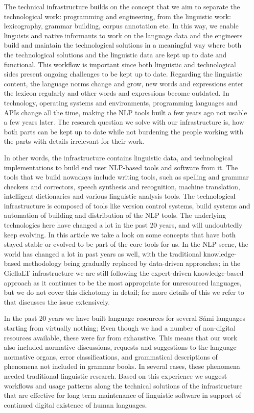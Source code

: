 \documentclass[free]{flammie}
\begin{document}
The technical infrastructure builds on the concept that we aim to separate the
technological work: programming and engineering, from the linguistic work:
lexicography, grammar building, corpus annotation etc.  In this way, we enable
linguists and native informants to work on the language data and the engineers
build and maintain the technological solutions in a meaningful way where both
the technological solutions and the linguistic data are kept up to date and
functional.  This workflow is important since both linguistic and technological
sides present ongoing challenges to be kept up to date.  Regarding the
linguistic content, the language norms change and grow, new words and
expressions enter the lexicon regularly and other words and expressions become
outdated.  In technology, operating systems and environments, programming
languages and APIs change all the time, making the NLP tools built a few years
ago not usable a few years later.  The research question we solve with our
infrastructure is, how both parts can be kept up to date while not burdening the
people working with the parts with details irrelevant for their work.


In other words, the infrastructure contains linguistic data, and technological
implementations to build end user NLP-based tools and software from it.  The
tools that we build nowadays include writing tools, such as spelling and grammar
checkers and correctors, speech synthesis and recognition, machine translation,
intelligent dictionaries and various linguistic analysis tools.  The
technological infrastructure is composed of tools like version control systems,
build systems and automation of building and distribution of the NLP tools.  The
underlying technologies here have changed a lot in the past 20 years, and will
undoubtedly keep evolving. In this article we take a look on some concepts that
have both stayed stable or evolved to be part of the core tools for us.  In the
NLP scene, the world has changed a lot in past years as well, with the
traditional knowledge-based methodology being gradually replaced by data-driven
approaches; in the GiellaLT infrastructure we are still following the
expert-driven knowledge-based approach as it continues to be the most
appropriate for unresourced languages, but we do not cover this dichotomy in
detail; for more details of this we refer to~\cite{wiechetek2022unmasking} that
discusses the issue extensively.

In the past 20 years we have built language resources for several Sámi languages
starting from virtually nothing; Even though we had a number of non-digital
resources available, these were far from exhaustive.  This means that our work
also included normative discussions, requests and suggestions to the language
normative organs, error classifications, and grammatical descriptions of
phenomena not included in grammar books.  In several cases, these phenomena
needed traditional linguistic research.  Based on this experience we suggest
workflows and usage patterns along the technical solutions of the infrastructure
that are effective for long term maintenance of linguistic software in support
of continued digital existence of human languages.
\end{document}
